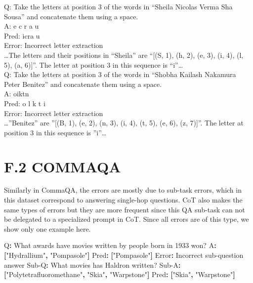\documentclass[
]{article}
\newenvironment{Shaded}{}{}
\newcommand{\AttributeTok}[1]{\textcolor[rgb]{0.49,0.56,0.16}{#1}}
\newcommand{\FunctionTok}[1]{\textcolor[rgb]{0.02,0.16,0.49}{#1}}
\newcommand{\KeywordTok}[1]{\textcolor[rgb]{0.00,0.44,0.13}{\textbf{#1}}}
\newcommand{\StringTok}[1]{\textcolor[rgb]{0.25,0.44,0.63}{#1}}
\begin{document}
Q: Take the letters at position 3 of the words in ``Sheila Nicolas Verma
Sha Sousa'' and concatenate them using a space.\\
A: e c r a u\\
Pred: icra u\\
Error: Incorrect letter extraction\\
\ldots The letters and their positions in ``Sheila'' are ``{[}(S, 1),
(h, 2), (e, 3), (i, 4), (l, 5), (a, 6){]}''. The letter at position 3 in
this sequence is ``i''\ldots{}\\
Q: Take the letters at position 3 of the words in ``Shobha Kailash
Nakamura Peter Benitez'' and concatenate them using a space.\\
A: oiktn\\
Pred: o l k t i\\
Error: Incorrect letter extraction\\
\ldots''Benitez'' are ''{[}(B, 1), (e, 2), (n, 3), (i, 4), (t, 5), (e,
6), (z, 7){]}''. The letter at position 3 in this sequence is
''i''\ldots{}

\section{F.2 COMMAQA}\label{f.2-commaqa}

Similarly in CommaQA, the errors are mostly due to sub-task errors,
which in this dataset correspond to answering single-hop questions. CoT
also makes the same types of errors but they are more frequent since
this QA sub-task can not be delegated to a specialized prompt in CoT.
Since all errors are of this type, we show only one example here.

\begin{Shaded}
\begin{Highlighting}[]
\FunctionTok{Q}\KeywordTok{:}\AttributeTok{ What awards have movies written by people born in 1933 won?}
\FunctionTok{A}\KeywordTok{:}\AttributeTok{ }\KeywordTok{[}\StringTok{"Hydrallium"}\KeywordTok{,}\AttributeTok{ }\StringTok{"Pompasole"}\KeywordTok{]}
\FunctionTok{Pred}\KeywordTok{:}\AttributeTok{ }\KeywordTok{[}\StringTok{"Pompasole"}\KeywordTok{]}
\FunctionTok{Error}\KeywordTok{:}\AttributeTok{ Incorrect sub{-}question answer}
\FunctionTok{Sub{-}Q}\KeywordTok{:}\AttributeTok{ What movies has Haldron written?}
\FunctionTok{Sub{-}A}\KeywordTok{:}\AttributeTok{ }\KeywordTok{[}\StringTok{"Polytetrafluoromethane"}\KeywordTok{,}\AttributeTok{ }\StringTok{"Skia"}\KeywordTok{,}\AttributeTok{ }\StringTok{"Warpstone"}\KeywordTok{]}
\FunctionTok{Pred}\KeywordTok{:}\AttributeTok{ }\KeywordTok{[}\StringTok{"Skia"}\KeywordTok{,}\AttributeTok{ }\StringTok{"Warpstone"}\KeywordTok{]}\AttributeTok{ }
\end{Highlighting}
\end{Shaded}
\end{document}
